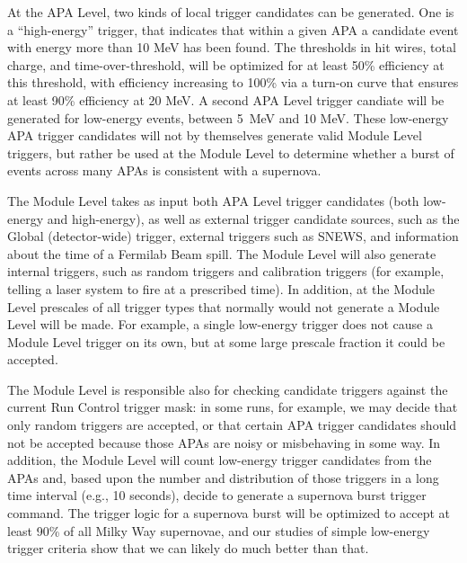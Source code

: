 	At the APA Level, two kinds of local trigger candidates can be
generated. One is a ``high-energy'' trigger, that indicates that within a given
APA a candidate event with energy more than 10 MeV has been found. The
thresholds in hit wires, total charge, and time-over-threshold, will be
optimized for at least 50\% efficiency at this threshold, with efficiency
increasing to 100\% via a turn-on curve that ensures at least 90\% efficiency
at 20 MeV.  A second APA Level trigger candiate will be generated for
low-energy events, between 5~MeV and 10 MeV. These low-energy APA trigger
candidates will not by themselves generate valid  Module Level triggers, but
rather be used at the Module Level to determine whether a burst of events
across many APAs is consistent with a supernova.

	The Module Level takes as input both APA Level trigger candidates (both
low-energy and high-energy), as well as external trigger candidate sources,
such as the Global (detector-wide) trigger, external triggers such as SNEWS,
and information about the time of a Fermilab Beam spill.  The Module Level will
also generate internal triggers, such as random triggers and calibration
triggers (for example, telling a laser system to fire at a prescribed time).
In addition, at the Module Level prescales of all trigger types that normally
would not generate a Module Level will be made. For example, a single
low-energy trigger does not cause a Module Level trigger on its own, but at
some large prescale fraction it could be accepted.



	The Module Level is responsible also for checking candidate triggers
against the current Run Control trigger mask: in some runs, for example, we
may decide that only random triggers are accepted, or that certain APA trigger
candidates should not be accepted because those APAs are noisy or misbehaving
in some way.  In addition, the Module Level will count low-energy trigger
candidates from the APAs and, based upon the number and distribution of those
triggers in a long time interval (e.g., 10 seconds), decide to generate a
supernova burst trigger command. The trigger logic for a supernova burst will
be optimized to accept at least 90\% of all Milky Way supernovae, and our
studies of simple low-energy trigger criteria show that we can likely do much
better than that.  

